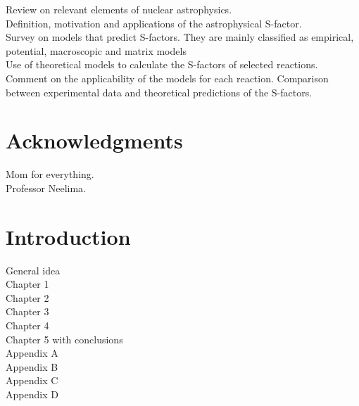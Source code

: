 \documentclass[openany]{book}
\begin{document}
Review on relevant elements of nuclear astrophysics. \\

Definition, motivation and applications of the astrophysical S-factor. \\

Survey on models that predict S-factors. They are mainly classified as empirical, potential, macroscopic and matrix models \\

Use of theoretical models to calculate the S-factors of selected reactions. \\

Comment on the applicability of the models for each reaction. Comparison between experimental data and theoretical predictions of the S-factors.

\clearpage

\chapter*{Acknowledgments}

Mom for everything. \\

Professor Neelima. 

\clearpage

\tableofcontents
\listoffigures
\listoftables



\chapter*{Introduction}

General idea\\ 

Chapter 1 \\

Chapter 2 \\

Chapter 3 \\

Chapter 4 \\

Chapter 5 with conclusions \\

Appendix A \\

Appendix B \\

Appendix C \\

Appendix D \\
\end{document}
